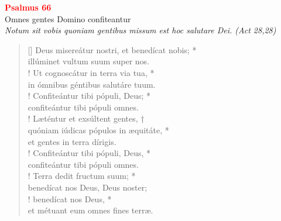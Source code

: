 


\def\greinitialformat#1{%
{\fontsize{39}{39}\selectfont #1}%
}




\vspace{0.3cm}
\begin{center}
 \textcolor{red}{\large \bf Psalmus 66}\\
Omnes gentes Domino confiteantur\\
\textit{\small Notum sit vobis quoniam gentibus missum est hoc salutare Dei. (Act 28,28)}
\end{center}
\begin{verse}[\versewidth]
Deus misereátur nostri, et benedícat nobis; *\\
illúminet vultum suum super nos.\\!
\vin Ut cognoscátur in terra via tua, *\\
\vin in ómnibus géntibus salutáre tuum.\\!
Confiteántur tibi pópuli, Deus; *\\
confiteántur tibi pópuli omnes.\\!
\vin Læténtur et exsúltent gentes, †\\
\vin quóniam iúdicas pópulos in æquitáte, *\\
\vin et gentes in terra dírigis.\\!
Confiteántur tibi pópuli, Deus, *\\
confiteántur tibi pópuli omnes.\\!
\vin Terra dedit fructum suum; *\\
\vin benedícat nos Deus, Deus noster;\\!
benedícat nos Deus, *\\
et métuant eum omnes fines terræ.\\
\end{verse}
\vspace{1cm}


